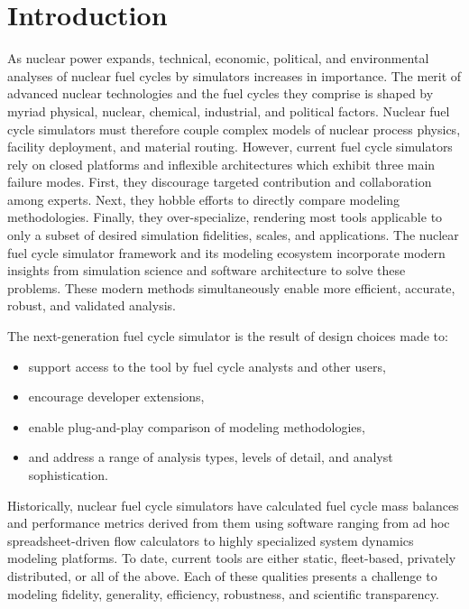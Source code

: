 
\section{Introduction}



As nuclear power expands, technical, economic, political, and environmental
analyses of nuclear fuel cycles by simulators increases in importance. The
merit of advanced nuclear technologies and the fuel cycles they comprise is
shaped by myriad physical, nuclear, chemical, industrial, and political
factors. Nuclear fuel cycle simulators must therefore couple complex models of
nuclear process physics, facility deployment, and material routing.  However,
current fuel cycle simulators rely on closed platforms and inflexible
architectures which exhibit three main failure modes. First, they discourage
targeted contribution and collaboration among experts. Next, they hobble
efforts to directly compare modeling methodologies. Finally, they
over-specialize, rendering most tools applicable to only a subset of desired
simulation fidelities, scales, and applications.  The \Cyclus nuclear fuel
cycle simulator framework and its modeling ecosystem incorporate modern
insights from simulation science and software architecture to solve these
problems.  These modern methods simultaneously enable more efficient, accurate,
robust, and validated analysis.

The \Cyclus next-generation fuel cycle simulator is the result of design
choices made to:
\begin{itemize}
\item support access to the tool by fuel cycle analysts and other users,
\item encourage developer extensions,
\item enable plug-and-play comparison of modeling methodologies,
\item and address a range of analysis types, levels of detail, and analyst sophistication.
\end{itemize}

Historically, nuclear fuel cycle simulators have calculated
fuel cycle mass balances and performance metrics derived from them using software
ranging from ad hoc spreadsheet-driven flow calculators to highly specialized
system dynamics modeling platforms. To date, current tools are either static, fleet-based,
privately distributed, or all of the above. Each of these qualities presents a
challenge to modeling fidelity, generality, efficiency, robustness, and
scientific transparency.

